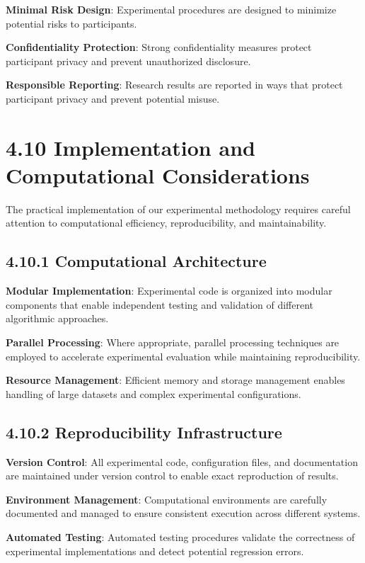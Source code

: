 \documentclass[
  12pt,
  a4paper,
]{report}
\begin{document}
\textbf{Minimal Risk Design}: Experimental procedures are designed to
minimize potential risks to participants.

\textbf{Confidentiality Protection}: Strong confidentiality measures
protect participant privacy and prevent unauthorized disclosure.

\textbf{Responsible Reporting}: Research results are reported in ways
that protect participant privacy and prevent potential misuse.

\section{4.10 Implementation and Computational
Considerations}\label{implementation-and-computational-considerations}

The practical implementation of our experimental methodology requires
careful attention to computational efficiency, reproducibility, and
maintainability.

\subsection{4.10.1 Computational
Architecture}\label{computational-architecture}

\textbf{Modular Implementation}: Experimental code is organized into
modular components that enable independent testing and validation of
different algorithmic approaches.

\textbf{Parallel Processing}: Where appropriate, parallel processing
techniques are employed to accelerate experimental evaluation while
maintaining reproducibility.

\textbf{Resource Management}: Efficient memory and storage management
enables handling of large datasets and complex experimental
configurations.

\subsection{4.10.2 Reproducibility
Infrastructure}\label{reproducibility-infrastructure}

\textbf{Version Control}: All experimental code, configuration files,
and documentation are maintained under version control to enable exact
reproduction of results.

\textbf{Environment Management}: Computational environments are
carefully documented and managed to ensure consistent execution across
different systems.

\textbf{Automated Testing}: Automated testing procedures validate the
correctness of experimental implementations and detect potential
regression errors.
\end{document}
